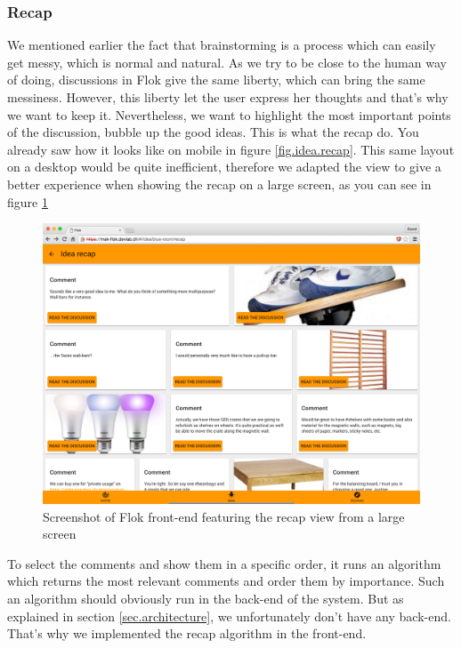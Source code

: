 \documentclass[a4paper,12pt, oneside]{article}
\begin{document}
\subsubsection{Recap}
\label{sec.recap}
We mentioned earlier the fact that brainstorming is a process which can easily get messy, which is normal and natural.
As we try to be close to the human way of doing, discussions in Flok give the same liberty, which can bring the same messiness.
However, this liberty let the user express her thoughts and that's why we want to keep it.
Nevertheless, we want to highlight the most important points of the discussion, bubble up the good ideas.
This is what the recap do.
You already saw how it looks like on mobile in figure \ref{fig.idea.recap}.
This same layout on a desktop would be quite inefficient, therefore we adapted the view to give a better experience when showing the recap on a large screen, as you can see in figure \ref{fig.recap.desktop}

\begin{figure}[!htb]
    \centering
    \includegraphics[width=\textwidth]{images/recapDesktop.png}
    \caption{Screenshot of Flok front-end featuring the recap view from a large screen}
    \label{fig.recap.desktop}
\end{figure}

To select the comments and show them in a specific order, it runs an algorithm which returns the most relevant comments and order them by importance.
Such an algorithm should obviously run in the back-end of the system.
But as explained in section \ref{sec.architecture}, we unfortunately don't have any back-end.
That's why we implemented the recap algorithm in the front-end.
\end{document}

